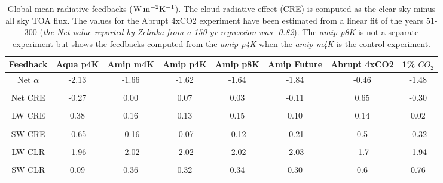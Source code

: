 \documentclass[draft]{agujournal2019}
\begin{document}
\begin{table}
\begin{center}
\caption{Global mean radiative feedbacks ($\rm{W\, m^{-2} K^{-1}}$).  The cloud radiative effect (CRE) is computed as
 the clear sky minus all sky TOA flux. The values for the Abrupt 4xCO2 experiment
have been estimated from a linear fit of the years 51-300 (\textit{the Net value reported by Zelinka from a 150 yr regression was -0.82}).  The \textit{amip p8K} is not a separate experiment but
shows the feedbacks computed from the \textit{amip-p4K} when the \textit{amip-m4K} is the control experiment.}
    \begin{tabular}{*{8}{c}}
    \hline
    \hline
 Feedback & Aqua p4K & Amip m4K & Amip p4K &  Amip p8K & Amip Future & Abrupt 4xCO2  & 1\% $CO_2$  \\ \hline
    Net  $\alpha$        &   -2.13      &  -1.66          &  -1.62         & -1.64           & -1.84        &    -0.46   & -1.48      \\ 
    \\
    Net CRE   & -0.27       &  0.00              & 0.07         & 0.03         & -0.11          & 0.65   & -0.30  \\  
    \\
    LW CRE   & 0.38        &  0.16              & 0.13           & 0.15        & 0.10          & 0.14  & 0.02    \\  
    \\
    SW CRE  & -0.65     &  -0.16              & -0.07          & -0.12        & -0.21         & 0.5  & -0.32       \\  
    \\
    LW CLR   & -1.96       &  -2.02            & -2.02           & -2.02       & -2.03         & -1.7   & -1.94      \\  
    \\
    SW CLR  & 0.09        & 0.36              & 0.32             & 0.34        & 0.30          & 0.6    & 0.76        \\  \hline

    \end{tabular}\par
    \label{tab:lambda}
\end{center}
\end{table}
    
\end{document}

